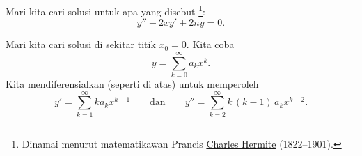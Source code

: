 \begin{example}
Mari kita cari solusi untuk apa yang disebut
\emph{}%
\footnote{Dinamai menurut matematikawan Prancis
\href{http://en.wikipedia.org/wiki/Hermite}{Charles Hermite}
(1822--1901).}:
\begin{equation*}
y'' -2xy' + 2n y = 0 .
\end{equation*}

Mari kita cari solusi di sekitar titik $x_0 = 0$.
Kita coba
\begin{equation*}
y = \sum_{k=0}^\infty a_k x^k .
\end{equation*}
Kita mendiferensialkan (seperti di atas) untuk memperoleh
\begin{equation*}
y' = \sum_{k=1}^\infty k a_k x^{k-1} 
\qquad \text{dan} \qquad
y'' = \sum_{k=2}^\infty k\,(k-1) \, a_k x^{k-2} .
\end{equation*}


\end{example}
